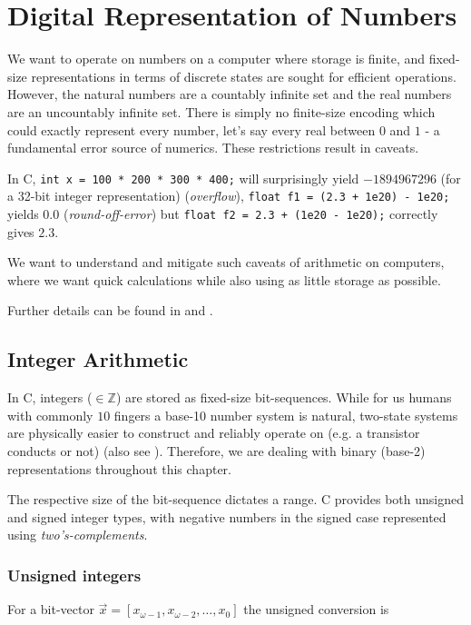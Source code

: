 \section{Digital Representation of Numbers}
\thispagestyle{plain}


We want to operate on numbers on a computer where storage is finite, and 
fixed-size representations in terms of discrete states are sought for efficient operations. However,
the natural numbers are a countably infinite set and the real numbers 
are an uncountably infinite set. There is simply no finite-size encoding
which could exactly represent every number, let's say every real between 
$0$ and $1$ - a fundamental error source of numerics. These restrictions
result in caveats.

In C, \texttt{int x = 100 * 200 * 300 * 400;} will surprisingly 
yield $-1894967296$ (for a 32-bit integer representation) (\textit{overflow}), 
\texttt{float f1 = (2.3 + 1e20) - 1e20;} yields $0.0$ (\textit{round-off-error}) but
\texttt{float f2 = 2.3 + (1e20 - 1e20);} correctly gives $2.3$.

We want to understand and mitigate such caveats of arithmetic on computers, 
where we want quick calculations while also
using as little storage as possible.

Further details can be found in \cite{higham02} and \cite{bryant2011computer}.

\subsection{Integer Arithmetic}

In C, integers ($\in \mathbb{Z}$) are stored as fixed-size bit-sequences. While for us humans
with commonly $10$ fingers a base-10 number system is natural, two-state systems are physically
easier to construct and reliably operate on (e.g. a transistor conducts or not) (also see \cite[Sec. 2.7]{higham02}). Therefore,
we are dealing with binary (base-2) representations throughout this chapter.

The respective size of the bit-sequence dictates a range. C provides both unsigned and signed 
integer types, with negative numbers in the signed case represented using \textit{two's-complements}.

\subsubsection{Unsigned integers}
For a bit-vector $\vec{x} = [x_{\omega-1},x_{\omega-2},\dots,x_0]$ the unsigned conversion is

